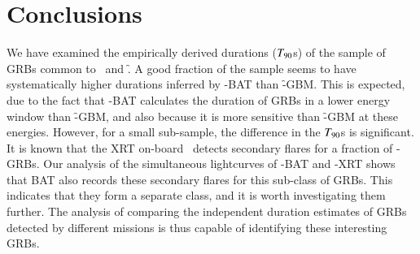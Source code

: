 \section*{Conclusions}

We have examined the empirically derived durations ($T_{\rm{90}}$s) of the sample of GRBs common to \s\ and \f. A good fraction of the sample seems to have systematically higher durations inferred by \s -BAT than \f -GBM. This is expected, due to the fact that \s -BAT calculates the duration of GRBs in a lower energy window than \f -GBM, and also because it is more sensitive than \f -GBM at these energies. However, for a small sub-sample, the difference in the $T_{\rm{90}}$s is significant. It is known that the XRT on-board \s\ detects secondary flares for a fraction of \s -GRBs. Our analysis of the simultaneous lightcurves of \s -BAT and \s -XRT shows that BAT also records these secondary flares for this sub-class of GRBs. This indicates that they form a separate class, and it is worth investigating them further. The analysis of comparing the independent duration estimates of GRBs detected by different missions is thus capable of identifying these interesting GRBs.